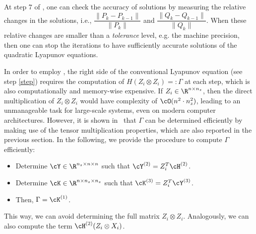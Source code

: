 \begin{remark}
	At step 7 of , one can check the accuracy of  solutions by measuring the relative changes  in the solutions, i.e., $\dfrac{\|P_k - P_{k-1} \|}{\|P_k\|}$ and $\dfrac{\|Q_k - Q_{k-1} \|}{\|Q_k\|}$. When these relative changes are smaller than a \emph{tolerance} level, e.g. the machine precision, then one can stop the iterations to have sufficiently accurate solutions of the quadratic Lyapunov equations. 
\end{remark}

\begin{remark}
In order to employ , the right side of the conventional Lyapunov equation (see step \ref{step}) requires the computation of  $H(Z_i\otimes Z_i) =: \Gamma$ at each step, which is also computationally and memory-wise expensive. If $Z_i \in  \R^{n\times n_z}$, then the direct multiplication of $Z_i\otimes Z_i$ would have complexity of $\cO(n^2\cdot n_z^2)$,  leading to an unmanageable task for large-scale systems, even on  modern computer architectures. However, it is shown in~\cite{morBenB15} that $\Gamma$ can be determined  efficiently by making use of the tensor multiplication properties, which are also reported in the previous section. In the following, we provide the procedure to compute $\Gamma$ efficiently:
\begin{itemize}
\item Determine $\cY \in \R^{n_z\times n\times n}$ such that $\cY^{(2)} = Z_i^T \cH^{(2)}$.
\item Determine $\cK \in \R^{n\times n_z \times n_z}$ such that $\cK^{(3)} = Z_i^T \cY^{(3)}$.
\item Then, $\Gamma = \cK^{(1)}$.
\end{itemize}
This way, we can avoid determining the full matrix $Z_i\otimes Z_i$.
Analogously, we can also compute  the term $\cH^{(2)}(Z_i\otimes X_i)$.
\end{remark}
 

